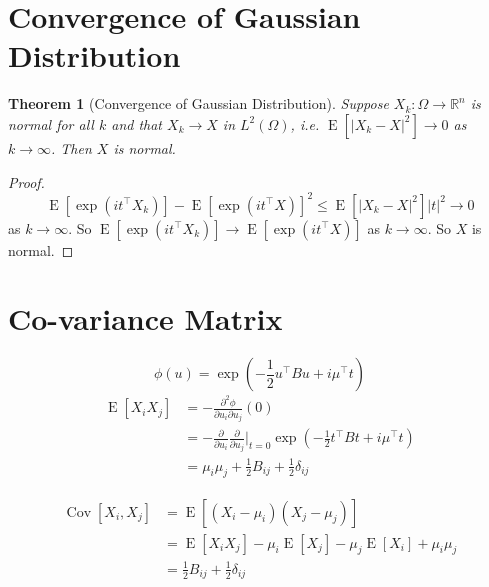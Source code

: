 \documentclass[12pt]{article}
\newtheorem{theorem}{Theorem}
\begin{document}
\section{Convergence of Gaussian Distribution}
\begin{theorem}[Convergence of Gaussian Distribution]
    Suppose $X_k:\Omega\rightarrow\mathbb{R}^n$ is normal for all $k$ and that $X_k\rightarrow X$ in $L^2(\Omega)$, i.e. $\operatorname{E}[|X_k-X|^2]\rightarrow 0$ as $k\rightarrow\infty$. Then $X$ is normal.
\end{theorem}
\begin{proof}
    $$\operatorname{E}[\exp(i t^{\top}X_k)]-\operatorname{E}[\exp(i t^{\top}X)]^2\le \operatorname{E}[|X_k-X|^2] |t|^2\rightarrow 0$$ as $k\rightarrow\infty$. So $\operatorname{E}[\exp(i t^{\top}X_k)]\rightarrow \operatorname{E}[\exp(i t^{\top}X)]$ as $k\rightarrow\infty$. So $X$ is normal.
\end{proof}

\section{Co-variance Matrix}
$$ \phi(u)=\exp\left(-\frac{1}{2}u^{\top}Bu+i\mu^{\top}t\right) $$
\begin{align}
    \operatorname{E}[X_i X_j] & =- \frac{\partial^2 \phi}{\partial u_i \partial u_j}(0)                                                                                \\
                              & =- \frac{\partial}{\partial u_i} \frac{\partial}{\partial u_j} \bigg|_{t=0} \exp \left(-\frac{1}{2} t^{\top} B t+i \mu^{\top} t\right) \\
                              & =\mu_i \mu_j + \frac{1}{2} B_{ij} + \frac{1}{2} \delta_{ij}
\end{align}

\begin{align}
    \operatorname{Cov}[X_i,X_j] & =\operatorname{E}[(X_i-\mu_i)(X_j-\mu_j)]                                                      \\
                                & =\operatorname{E}[X_i X_j]-\mu_i \operatorname{E}[X_j]-\mu_j \operatorname{E}[X_i]+\mu_i \mu_j \\
                                & =\frac{1}{2} B_{ij} + \frac{1}{2} \delta_{ij}
\end{align}
\end{document}
